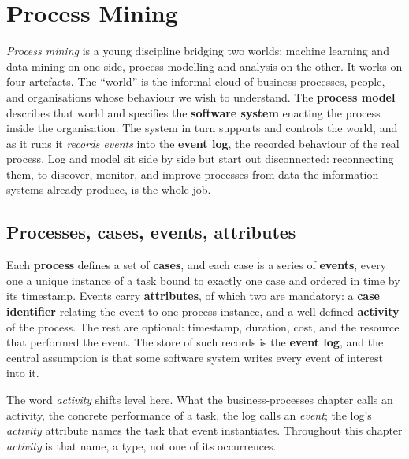 \newpage
\section{Process Mining}

\emph{Process mining} is a young discipline bridging two worlds: machine learning and data mining on one side, process modelling and analysis on the other. It works on four artefacts. The ``world'' is the informal cloud of business processes, people, and organisations whose behaviour we wish to understand. The \textbf{process model} describes that world and specifies the \textbf{software system} enacting the process inside the organisation. The system in turn supports and controls the world, and as it runs it \emph{records events} into the \textbf{event log}, the recorded behaviour of the real process. Log and model sit side by side but start out disconnected: reconnecting them, to discover, monitor, and improve processes from data the information systems already produce, is the whole job.

\subsection{Processes, cases, events, attributes}

Each \textbf{process} defines a set of \textbf{cases}, and each case is a series of \textbf{events}, every one a unique instance of a task bound to exactly one case and ordered in time by its timestamp. Events carry \textbf{attributes}, of which two are mandatory: a \textbf{case identifier} relating the event to one process instance, and a well-defined \textbf{activity} of the process. The rest are optional: timestamp, duration, cost, and the resource that performed the event. The store of such records is the \textbf{event log}, and the central assumption is that some software system writes every event of interest into it.

The word \emph{activity} shifts level here. What the business-processes chapter calls an activity, the concrete performance of a task, the log calls an \emph{event}; the log's \emph{activity} attribute names the task that event instantiates. Throughout this chapter \emph{activity} is that name, a type, not one of its occurrences.

